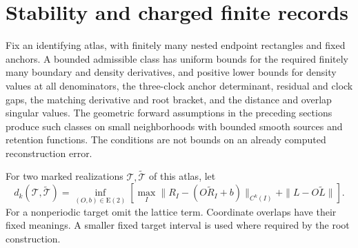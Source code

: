 \section{Stability and charged finite records}
\label{sec:v77-stability}

Fix an identifying atlas, with finitely many nested endpoint rectangles
and fixed anchors.  A bounded admissible class has uniform bounds for
the required finitely many boundary and density derivatives, and positive
lower bounds for density values at all denominators, the three-clock
anchor determinant, residual and clock gaps, the matching derivative
and root bracket, and the distance and overlap singular values.  The
geometric forward assumptions in the preceding sections produce such
classes on small neighborhoods with bounded smooth sources and retention
functions.  The conditions are not bounds on an already computed
reconstruction error.

For two marked realizations $\mathcal T,\widetilde{\mathcal T}$ of this
atlas, let
\[
 d_k(\mathcal T,\widetilde{\mathcal T})
 =\inf_{(O,b)\in\mathrm E(2)}\left[
  \max_I\|R_I-(O\widetilde R_I+b)\|_{C^k(I)}
       +\|L-O\widetilde L\|\right].
\]
For a nonperiodic target omit the lattice term.  Coordinate overlaps
have their fixed meanings.  A smaller fixed target interval is used
where required by the root construction.

